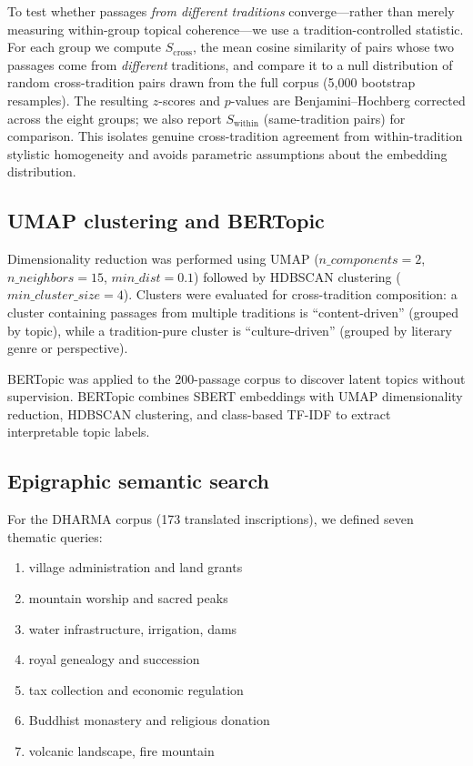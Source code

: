 \documentclass[12pt]{article}
\begin{document}
To test whether passages \emph{from different traditions} converge---rather than merely measuring within-group topical coherence---we use a tradition-controlled statistic. For each group we compute $S_\mathrm{cross}$, the mean cosine similarity of pairs whose two passages come from \emph{different} traditions, and compare it to a null distribution of random cross-tradition pairs drawn from the full corpus (5{,}000 bootstrap resamples).
The resulting $z$-scores and $p$-values are Benjamini--Hochberg corrected across the eight groups; we also report $S_\mathrm{within}$ (same-tradition pairs) for comparison.
This isolates genuine cross-tradition agreement from within-tradition stylistic homogeneity and avoids parametric assumptions about the embedding distribution.

\subsection{UMAP clustering and BERTopic}

Dimensionality reduction was performed using UMAP \citep{McInnes2018} ($n\_components = 2$, $n\_neighbors = 15$, $min\_dist = 0.1$) followed by HDBSCAN clustering \citep{McInnes2017} ($min\_cluster\_size = 4$).
Clusters were evaluated for cross-tradition composition: a cluster containing passages from multiple traditions is ``content-driven'' (grouped by topic), while a tradition-pure cluster is ``culture-driven'' (grouped by literary genre or perspective).

BERTopic \citep{Grootendorst2022} was applied to the 200-passage corpus to discover latent topics without supervision.
BERTopic combines SBERT embeddings with UMAP dimensionality reduction, HDBSCAN clustering, and class-based TF-IDF to extract interpretable topic labels.

\subsection{Epigraphic semantic search}

For the DHARMA corpus (173 translated inscriptions), we defined seven thematic queries:
\begin{enumerate}
    \item village administration and land grants
    \item mountain worship and sacred peaks
    \item water infrastructure, irrigation, dams
    \item royal genealogy and succession
    \item tax collection and economic regulation
    \item Buddhist monastery and religious donation
    \item volcanic landscape, fire mountain
\end{enumerate}
\end{document}
